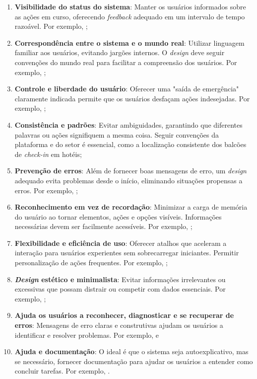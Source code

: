 \begin{enumerate}
    \item \textbf{Visibilidade do status do sistema}: Manter os usuários informados sobre as ações em curso, oferecendo \textit{feedback} adequado em um intervalo de tempo razoável. Por exemplo, ;
    \item \textbf{Correspondência entre o sistema e o mundo real}: Utilizar linguagem familiar aos usuários, evitando jargões internos. O \textit{design} deve seguir convenções do mundo real para facilitar a compreensão dos usuários. Por exemplo, ;
    \item \textbf{Controle e liberdade do usuário}: Oferecer uma "saída de emergência" claramente indicada permite que os usuários desfaçam ações indesejadas. Por exemplo, ;
    \item \textbf{Consistência e padrões}: Evitar ambiguidades, garantindo que diferentes palavras ou ações signifiquem a mesma coisa. Seguir convenções da plataforma e do setor é essencial, como a localização consistente dos balcões de \textit{check-in} em hotéis;
    \item \textbf{Prevenção de erros}: Além de fornecer boas mensagens de erro, um \textit{design} adequado evita problemas desde o início, eliminando situações propensas a erros. Por exemplo, ;
    \item \textbf{Reconhecimento em vez de recordação}: Minimizar a carga de memória do usuário ao tornar elementos, ações e opções visíveis. Informações necessárias devem ser facilmente acessíveis. Por exemplo, ;
    \item \textbf{Flexibilidade e eficiência de uso}: Oferecer atalhos que aceleram a interação para usuários experientes sem sobrecarregar iniciantes. Permitir personalização de ações frequentes. Por exemplo, ;
    \item \textbf{\textit{Design} estético e minimalista}: Evitar informações irrelevantes ou excessivas que possam distrair ou competir com dados essenciais. Por exemplo, ;
    \item \textbf{Ajuda os usuários a reconhecer, diagnosticar e se recuperar de erros}: Mensagens de erro claras e construtivas ajudam os usuários a identificar e resolver problemas. Por exemplo, e
    \item \textbf{Ajuda e documentação}: O ideal é que o sistema seja autoexplicativo, mas se necessário, fornecer documentação para ajudar os usuários a entender como concluir tarefas. Por exemplo, .
\end{enumerate}

